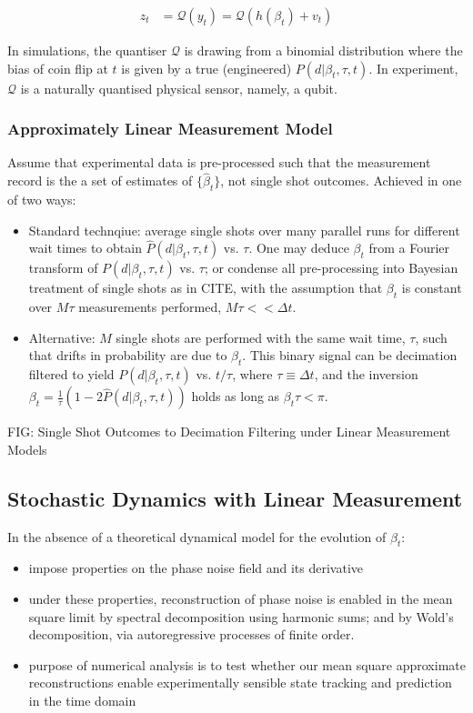 \begin{align}
z_t &= \mathcal{Q}(y_t) = \mathcal{Q}(h(\beta_t) + v_t)
\end{align}

In simulations, the quantiser $\mathcal{Q}$ is drawing from a binomial distribution where the bias of coin flip at $t$ is given by a true (engineered) $P(d | \beta_t, \tau, t)$. In experiment, $\mathcal{Q}$ is a naturally quantised physical sensor, namely, a qubit.

\subsubsection{Approximately Linear Measurement Model}
Assume that experimental data is pre-processed such that the measurement record is the a set of estimates of $\{ \hat{\beta}_t \}$, not single shot outcomes. Achieved in one of two ways:

\begin{itemize}
\item Standard technqiue:  average single shots over many parallel runs for different wait times to obtain $\hat{P}(d | \beta_t, \tau, t)$ vs. $\tau$. One may deduce $\beta_t$ from a Fourier transform of $P(d | \beta_t, \tau, t) $ vs. $ \tau$; or condense all pre-processing into Bayesian treatment of single shots as in CITE, with the assumption that $\beta_t$ is constant over $M\tau$ measurements performed, $M\tau << \Delta t$. 
\item Alternative: $M$ single shots are performed with the same wait time, $\tau$, such that drifts in probability are due to $\beta_t$. This binary signal can be decimation filtered to yield $P(d | \beta_t, \tau, t) $ vs. $t/\tau$, where $ \tau \equiv \Delta t$, and the inversion $\beta_t = \frac{1}{\tau} (1- 2\hat{P}(d | \beta_t, \tau, t))$ holds as long as $\beta_t \tau < \pi $. 
\end{itemize}

FIG: Single Shot Outcomes to Decimation Filtering under Linear Measurement Models

\subsection{Stochastic Dynamics with Linear Measurement}
In the absence of a theoretical dynamical model for the evolution of $\beta_t$:
\begin{itemize} 
\item impose properties on the phase noise field and its derivative
\item under these properties, reconstruction of phase noise is enabled in the mean square limit by spectral decomposition using harmonic sums; and by Wold's decomposition, via autoregressive processes of finite order.
\item purpose of numerical analysis is to test whether our mean square approximate reconstructions enable experimentally sensible state tracking and prediction in the time domain
\end{itemize}

